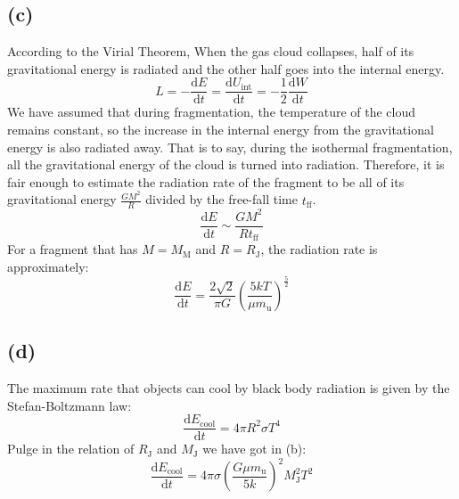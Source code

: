 \documentclass[a4paper,12pt]{article}
\renewcommand{\d}{\mathrm{d}}
\begin{document}
\subsection*{(c)}
According to the Virial Theorem, When the gas cloud collapses, half of its gravitational energy 
is radiated and the other half goes into the internal energy.
\begin{equation*}
    L = -\frac{\d E}{\d t} = \frac{\d U_{\text{int}}}{\d t} =-\frac{1}{2} \frac{\d W}{\d t}
\end{equation*}
We have assumed that during fragmentation, the temperature of the cloud remains constant, so the 
increase in the internal energy from the gravitational energy is also radiated away. That is to say, 
during the isothermal fragmentation, all the gravitational energy of the cloud is turned into radiation. 
Therefore, it is fair enough to estimate the radiation rate of the fragment to be all of its gravitational 
energy $\frac{GM^2}{R}$ divided by the free-fall time $t_{\text{ff}}$.
\begin{equation*}
    \frac{\d E}{\d t} \sim \frac{GM^2}{Rt_{\text{ff}}}
\end{equation*}
For a fragment that has $M = M_{\text{M}}$ and $R = R_{\text{J}}$, the radiation rate is approximately:
\begin{equation*}
    \frac{\d E}{\d t} = \frac{2\sqrt{2}}{\pi G} (\frac{5kT}{\mu m_{\text{u}}})^{\frac{5}{2}}
\end{equation*}

\subsection*{(d)}
The maximum rate that objects can cool by black body radiation is given by the Stefan-Boltzmann law:
\begin{equation*}
    \frac{\d E_{\text{cool}}}{\d t} = 4\pi R^2 \sigma T^4 
\end{equation*}
Pulge in the relation of $R_\text{J}$ and $M_\text{J}$ we have got in (b):
\begin{equation*}
    \frac{\d E_{\text{cool}}}{\d t} = 4\pi \sigma (\frac{G\mu m_\text{u}}{5k})^2 M_\text{J}^2 T^2
\end{equation*}
\end{document}
